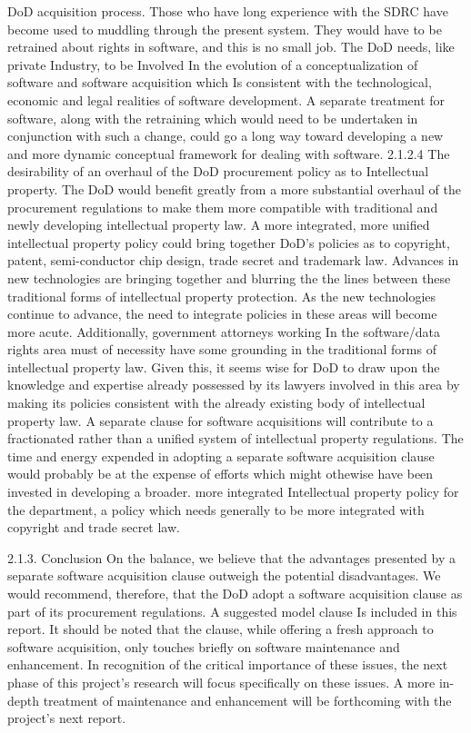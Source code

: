 \documentclass[12pt]{article}
\begin{document}
DoD acquisition process. Those who have long experience with the SDRC have become used to
muddling through the present system. They would have to be retrained about rights in software, and
this is no small job.
The DoD needs, like private Industry, to be Involved In the evolution of a conceptualization of software
and software acquisition which Is consistent with the technological, economic and legal realities of
software development. A separate treatment for software, along with the retraining which would need
to be undertaken in conjunction with such a change, could go a long way toward developing a new
and more dynamic conceptual framework for dealing with software.
2.1.2.4 The desirability of an overhaul of the DoD procurement policy as to Intellectual
property.
The DoD would benefit greatly from a more substantial overhaul of the procurement regulations to
make them more compatible with traditional and newly developing intellectual property law. A more
integrated, more unified intellectual property policy could bring together DoD's policies as to
copyright, patent, semi-conductor chip design, trade secret and trademark law. Advances in new
technologies are bringing together and blurring the the lines between these traditional forms of intellectual property protection. As the new technologies continue to advance, the need to integrate
policies in these areas will become more acute. Additionally, government attorneys working In the
software/data rights area must of necessity have some grounding in the traditional forms of intellectual property law. Given this, it seems wise for DoD to draw upon the knowledge and expertise
already possessed by its lawyers involved in this area by making its policies consistent with the
already existing body of intellectual property law.
A separate clause for software acquisitions will contribute to a fractionated rather than a unified
system of intellectual property regulations. The time and energy expended in adopting a separate
software acquisition clause would probably be at the expense of efforts which might othewise have
been invested in developing a broader. more integrated Intellectual property policy for the department, a policy which needs generally to be more integrated with copyright and trade secret law.

2.1.3. Conclusion
On the balance, we believe that the advantages presented by a separate software acquisition clause
outweigh the potential disadvantages. We would recommend, therefore, that the DoD adopt a software acquisition clause as part of its procurement regulations. A suggested model clause Is included
in this report. It should be noted that the clause, while offering a fresh approach to software acquisition, only touches briefly on software maintenance and enhancement. In recognition of the critical
importance of these issues, the next phase of this project's research will focus specifically on these
issues. A more in-depth treatment of maintenance and enhancement will be forthcoming with the
project's next report.
\end{document}
